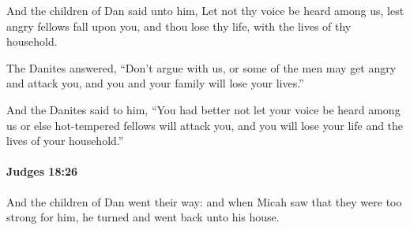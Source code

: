 			\begin{versebox}
					\item[BHS] 
					\item[ASV] And the children of Dan said unto him, Let not thy voice be heard among us, lest angry fellows fall upon you, and thou lose thy life, with the lives of thy household.
					\item[NIV] The Danites answered, “Don’t argue with us, or some of the men may get angry and attack you, and you and your family will lose your lives.”
					\item[NRSV] And the Danites said to him, “You had better not let your voice be heard among us or else hot-tempered fellows will attack you, and you will lose your life and the lives of your household.”
			\end{versebox}

		\paragraph{Judges 18:26} %
			\label{JUDGES-18-26}

			And the children of Dan went their way: and when Micah saw that they were too strong for him, he turned and went back unto his house.

